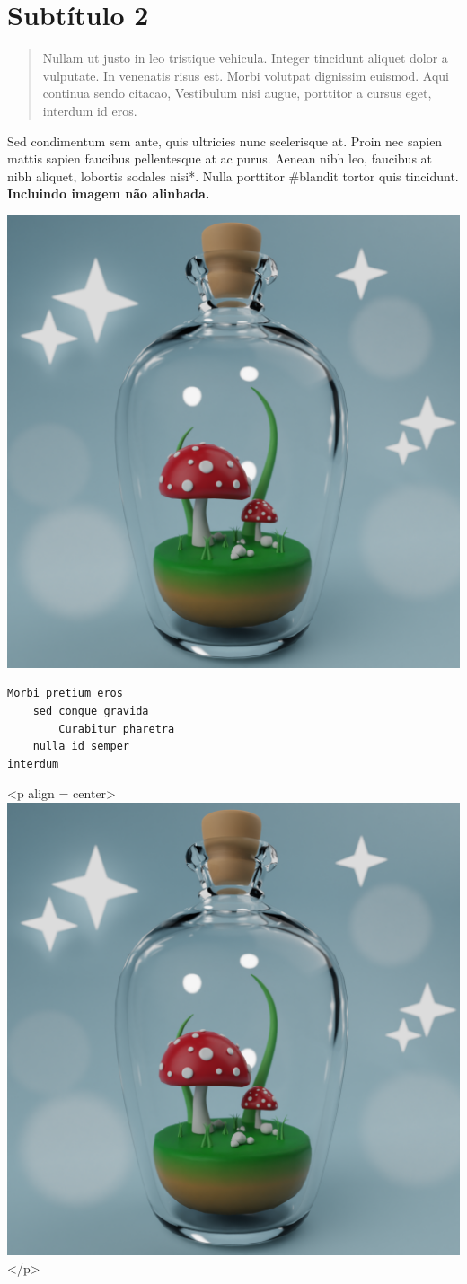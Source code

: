 \documentclass[10pt]{book}
\begin{document}
\section{Subtítulo 2}

\begin{quotation}
 Nullam ut justo in leo tristique vehicula. Integer tincidunt aliquet dolor a vulputate. In venenatis risus est. Morbi volutpat dignissim euismod. 
Aqui continua sendo citacao, Vestibulum nisi augue, porttitor a cursus eget, interdum id eros. 
\end{quotation}

Sed condimentum sem ante, quis ultricies nunc scelerisque at. Proin nec sapien mattis sapien faucibus pellentesque at ac purus. Aenean nibh leo, faucibus at nibh aliquet, lobortis sodales nisi\**. Nulla porttitor \#blandit tortor quis tincidunt. \textbf{Incluindo imagem não alinhada.}

\includegraphics[width = .6\textwidth]{imgs/jar.png}

\begin{verbatim}
Morbi pretium eros 
    sed congue gravida
        Curabitur pharetra 
    nulla id semper 
interdum
\end{verbatim}

<p align = center>
\includegraphics[width = .6\textwidth]{imgs/jar.png}
</p>
\end{document}
